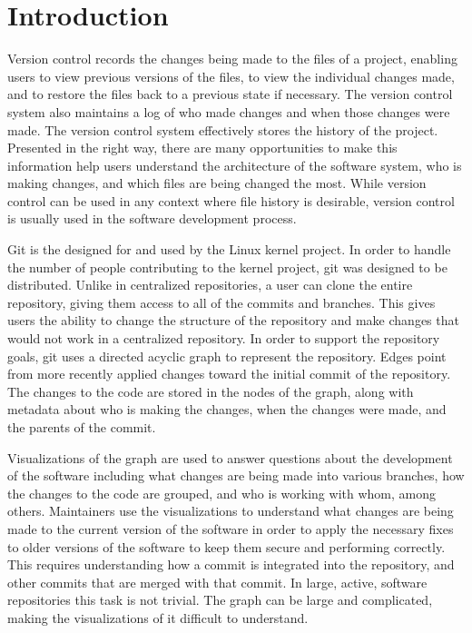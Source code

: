 \chapter{Introduction}

Version control records the changes being made to the files of a
project, enabling users to view previous versions of the files, to view
the individual changes made, and to restore the files back to a previous
state if necessary. The version control system also maintains a log of
who made changes and when those changes were made. The version control
system effectively stores the history of the project. Presented in the
right way, there are many opportunities to make this information help
users understand the architecture of the software system, who is making
changes, and which files are being changed the most. While version
control can be used in any context where file history is desirable,
version control is usually used in the software development process.

Git is the  designed for and used by
the Linux kernel project. In order to handle the number of people
contributing to the kernel project, git was designed to be distributed.
Unlike in centralized repositories, a user can clone the entire
repository, giving them access to all of the commits and branches. This
gives users the ability to change the structure of the repository and
make changes that would not work in a centralized repository. In order
to support the repository goals, git uses a directed acyclic graph to
represent the repository. Edges point from more recently applied changes
toward the initial commit of the repository. The changes to the code are
stored in the nodes of the graph, along with metadata about who is
making the changes, when the changes were made, and the parents of the
commit.

Visualizations of the graph are used to answer questions about the
development of the software including what changes are being made into
various branches, how the changes to the code are grouped, and who is
working with whom, among others. Maintainers use the visualizations to
understand what changes are being made to the current version of the
software in order to apply the necessary fixes to older versions of the
software to keep them secure and performing correctly. This requires
understanding how a commit is integrated into the repository, and other
commits that are merged with that commit. In large, active, software
repositories this task is not trivial. The graph can be large and
complicated, making the visualizations of it difficult to understand.

